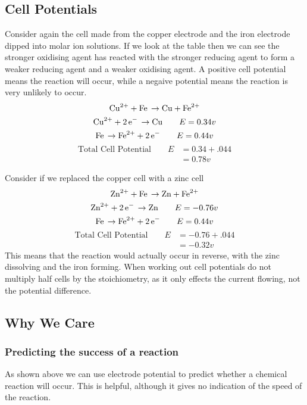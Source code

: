 \documentclass[a4paper, 12pt]{article}
\begin{document}
		\pagebreak
		
	\subsection{Cell Potentials}
		Consider again the cell made from the copper electrode and the iron electrode dipped into molar ion solutions. 	If we look at the table then we can see the stronger oxidising agent has reacted with the stronger reducing agent to form a weaker reducing agent and a weaker oxidising agent. A positive cell potential means the reaction will occur, while a negaive potential means the reaction is very unlikely to occur. 
		\[ \ce{Cu^2+ + Fe \rightarrow Cu + Fe^2+} \]
		\[ \ce{Cu^2+ + 2e- \rightarrow Cu} \qquad E = 0.34v \]
		\[ \ce{Fe \rightarrow Fe^2+ + 2e-} \qquad E = 0.44v \]		
		\begin{align*}
			\text{Total Cell Potential} \qquad E &= 0.34 + .044 \\
	       		&= 0.78v
		\end{align*} 
		
		Consider if we replaced the copper cell with a zinc cell
		\[ \ce{Zn^2+ + Fe \rightarrow Zn + Fe^2+} \]
		\[ \ce{Zn^2+ + 2e- \rightarrow Zn} \qquad E = -0.76v \]
		\[ \ce{Fe \rightarrow Fe^2+ + 2e-} \qquad E = 0.44v \]		
		\begin{align*}
			\text{Total Cell Potential} \qquad E &= -0.76 + .044 \\
	       		&= -0.32v
		\end{align*} 			
 			This means that the reaction would actually occur in reverse, with the zinc dissolving and the iron forming. When working out cell potentials do not multiply half cells by the stoichiometry, as it only effects the current flowing, not the potential difference. 
 			
	\subsection{Why We Care}
		\subsubsection*{Predicting the success of a reaction}
			As shown above we can use electrode potential to predict whether a chemical reaction will occur. This is helpful, although it gives no indication of the speed of the reaction.
\end{document}
